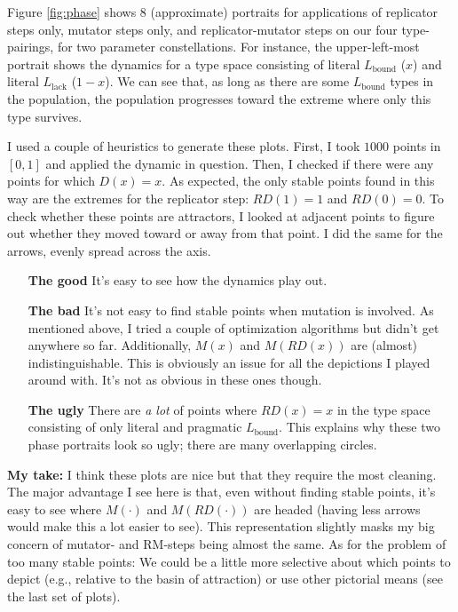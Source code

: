 \documentclass[fleqn,reqno,10pt]{article}
\newcommand{\mylang}[1]{\ensuremath{L_{\text{#1}}}\xspace} %
\newcommand{\Lbound}{\mylang{bound}}
\newcommand{\Llack}{\mylang{lack}}
\begin{document}
Figure \ref{fig:phase} shows $8$ (approximate) portraits for applications of replicator steps only, mutator steps only, and replicator-mutator steps on our four type-pairings, for two parameter constellations. For instance, the upper-left-most portrait shows the dynamics for a type space consisting of literal $\Lbound$ ($x$) and literal $\Llack$ ($1-x$). We can see that, as long as there are some $\Lbound$ types in the population, the population progresses toward the extreme where only this type survives. 

I used a couple of heuristics to generate these plots. First, I took $1000$ points in $[0,1]$ and applied the dynamic in question. Then, I checked if there were any points for which $D(x) = x$. As expected, the only stable points found in this way are the extremes for the replicator step: $RD(1) = 1$ and $RD(0) = 0$. To check whether these points are attractors, I looked at adjacent points to figure out whether they moved toward or away from that point. I did the same for the arrows, evenly spread across the axis.
\begin{itemize}
\item[{\bf The good}] It's easy to see how the dynamics play out. 
\item[{\bf The bad}] It's not easy to find stable points when mutation is involved. As mentioned above, I tried a couple of optimization algorithms but didn't get anywhere so far. Additionally, $M(x)$ and $M(RD(x))$ are (almost) indistinguishable. This is obviously an issue for all the depictions I played around with. It's not as obvious in these ones though.
\item[{\bf The ugly}] There are {\em a lot} of points where $RD(x) = x$ in the type space consisting of only literal and pragmatic $\Lbound$. This explains why these two phase portraits look so ugly; there are many overlapping circles.
\end{itemize}
{\bf My take:} I think these plots are nice but that they require the most cleaning. The major advantage I see here is that, even without finding stable points, it's easy to see where $M(\cdot)$ and $M(RD(\cdot))$ are headed (having less arrows would make this a lot easier to see). This representation slightly masks my big concern of mutator- and RM-steps being almost the same. As for the problem of too many stable points: We could be a little more selective about which points to depict (e.g., relative to the basin of attraction) or use other pictorial means (see the last set of plots).  
\end{document}

